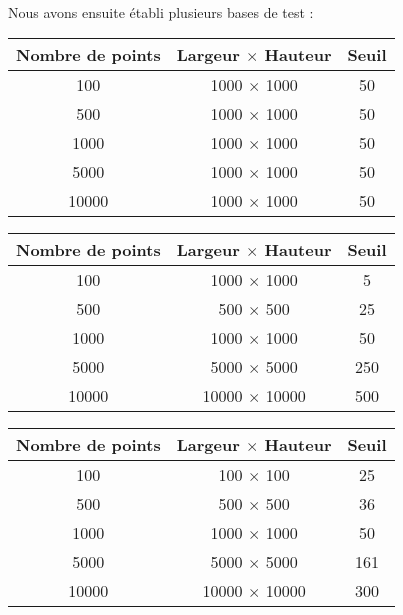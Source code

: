 \paragraph{}
Nous avons ensuite établi plusieurs bases de test :

\begin{center}
\begin{tabular}{|*{3}{c|}}
    \hline
     Nombre de points  & Largeur $\times$ Hauteur  & Seuil \\
    \hline
    100  & 1000 $\times$ 1000 & 50 \\
    \hline
    500  & 1000 $\times$ 1000  & 50 \\
    \hline
    1000  & 1000 $\times$ 1000  & 50 \\
    \hline
    5000  & 1000 $\times$ 1000  & 50 \\
    \hline
    10000  & 1000 $\times$ 1000  & 50 \\
    \hline
\end{tabular}
\end{center}

\begin{center}
\begin{tabular}{|*{3}{c|}}
    \hline
     Nombre de points  & Largeur $\times$ Hauteur  & Seuil \\
    \hline
    100  & 1000 $\times$ 1000 & 5 \\
    \hline
    500  & 500 $\times$ 500  & 25 \\
    \hline
    1000  & 1000 $\times$ 1000  & 50 \\
    \hline
    5000  & 5000 $\times$ 5000  & 250 \\
    \hline
    10000  & 10000 $\times$ 10000  & 500 \\
    \hline
\end{tabular}
\end{center}

\begin{center}
\begin{tabular}{|*{3}{c|}}
    \hline
     Nombre de points  & Largeur $\times$ Hauteur  & Seuil \\
    \hline
    100  & 100 $\times$ 100 & 25 \\
    \hline
    500  & 500 $\times$ 500  & 36 \\
    \hline
    1000  & 1000 $\times$ 1000  & 50 \\
    \hline
    5000  & 5000 $\times$ 5000  & 161 \\
    \hline
    10000  & 10000 $\times$ 10000  & 300 \\
    \hline
\end{tabular}
\end{center}

